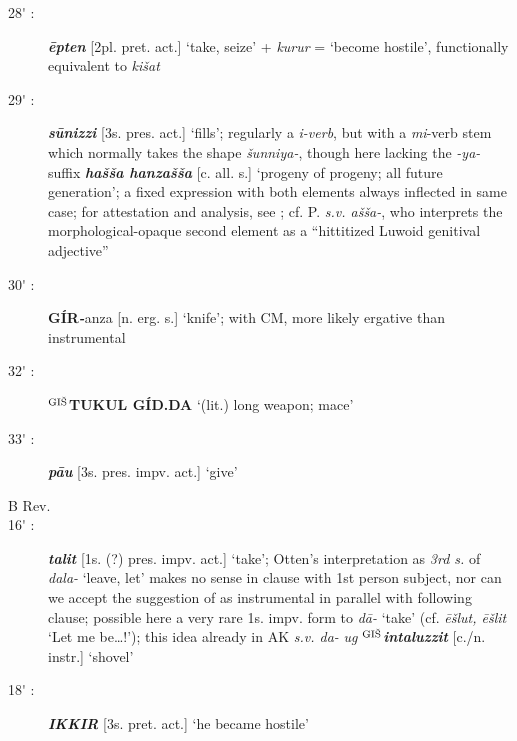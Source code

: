 \documentclass[10pt]{article}
\newcommand{\supersc}[1]{$^{\textrm{\scriptsize{#1}}}$}  	%
\newcommand{\bit}[1]{\textbf{\textit{#1}}}				%
\newcommand{\p}[1]{{\tiny[{#1}]}}					%
\newcommand{\pr}{\'{ }}									%
\newcommand{\hith}{\textsubwedge{h}}
\newcommand{\wood}{\supersc{GI\v{S}}}
\renewcommand{\.}[1]{\textsubdot{#1}}
\begin{document}
\begin{description}
\item[28{\pr} :] \bit{\=epten} \p{2pl. pret. act.} `take, seize' + \textit{kurur} = `become hostile', functionally equivalent to \textit{ki\v{s}at}  

\item[29{\pr} :] \bit{s\=unizzi} \p{3s. pres. act.} `fills'; regularly a \textit{{\hith}i-verb}, but with a \textit{mi}-verb stem which normally takes the shape \textit{\v{s}unniya-}, though here lacking the \textit{-ya-} suffix \bit{ha\v{s}\v{s}a hanza\v{s}\v{s}a} \p{c. all. s.} `progeny of progeny; all future generation'; a fixed expression with both elements always inflected in same case; for attestation and analysis, see \citet{melchert1976hassa}; cf. P. \textit{s.v. {\hith}a\v{s}\v{s}a-}, who interprets the morphological-opaque second element as a ``hittitized Luwoid genitival adjective''

\item[30{\pr} :] \textbf{G\'IR}{\bit -anza} \p{n. erg. s.} `knife'; with CM, more likely ergative than instrumental \citep[\textit{pace}][]{otten1973zalpa, holland2007zalpa}

\item[32{\pr} :] \textbf{{\wood}TUKUL G\'ID.DA} `(lit.) long weapon; mace'
\item[33{\pr} :] \bit{p\=au} \p{3s. pres. impv. act.} `give'

\smallskip

\item[B Rev.]

\smallskip

\item[16{\pr} :] \bit{talit} \p{1s. (?) pres. impv. act.} `take'; Otten's interpretation as \textit{3rd s.} of \textit{dala-} `leave, let' makes no sense in clause with 1st person subject, nor can we accept the suggestion of \citet{holland2007zalpa} as instrumental in parallel with following clause; possible here a very rare 1s. impv. form to \textit{d\=a-} `take' (cf. \textit{\=e\v{s}lut, \=e\v{s}lit} `Let me be\ldots!'); this idea already in AK \textit{s.v. da-} \textit{ug} \bit{{\wood}intaluzzit} \p{c./n. instr.} `shovel'

\item[18{\pr} :] \bit{IKKIR} \p{3s. pret. act.} `he became hostile'



\end{description}
\end{document}
